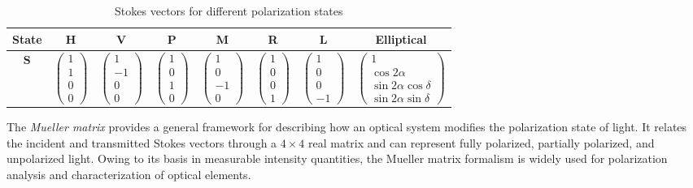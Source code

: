 \begin{table}[H]
\centering
\caption{Stokes vectors for different polarization states}
\begin{tabular}{|c|c|c|c|c|c|c|c|}
\toprule
State & H & V & P & M & R & L & Elliptical \\
\midrule

$\mathbf{S}$ &
$\begin{pmatrix}1\\[2pt]1\\[2pt]0\\[2pt]0\end{pmatrix}$ &
$\begin{pmatrix}1\\[2pt]-1\\[2pt]0\\[2pt]0\end{pmatrix}$ &
$\begin{pmatrix}1\\[2pt]0\\[2pt]1\\[2pt]0\end{pmatrix}$ &
$\begin{pmatrix}1\\[2pt]0\\[2pt]-1\\[2pt]0\end{pmatrix}$ &
$\begin{pmatrix}1\\[2pt]0\\[2pt]0\\[2pt]1\end{pmatrix}$ &
$\begin{pmatrix}1\\[2pt]0\\[2pt]0\\[2pt]-1\end{pmatrix}$ &
$\begin{pmatrix}
1\\[2pt]
\cos 2\alpha\\[2pt]
\sin 2\alpha \cos\delta\\[2pt]
\sin 2\alpha \sin\delta
\end{pmatrix}$ \\

\bottomrule
\end{tabular}

\label{tab:stokes_vectors}
\end{table}

The \emph{Mueller matrix} provides a general framework for describing how an optical system modifies the polarization state of light. It relates the incident and transmitted Stokes vectors through a $4\times4$ real matrix and can represent fully polarized, partially polarized, and unpolarized light. Owing to its basis in measurable intensity quantities, the Mueller matrix formalism is widely used for polarization analysis and characterization of optical elements.

